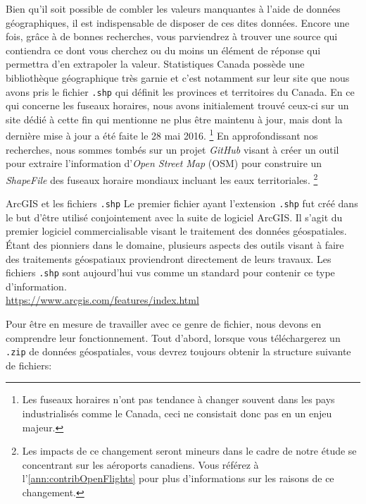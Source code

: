 Bien qu'il soit possible de combler les valeurs manquantes à l'aide de données géographiques, il est indispensable de disposer de ces dites données. Encore une fois, grâce à de bonnes recherches, vous parviendrez à trouver une source qui contiendra ce dont vous cherchez ou du moins un élément de réponse qui permettra d'en extrapoler la valeur. Statistiques Canada possède une bibliothèque géographique très garnie et c'est notamment sur leur site que nous avons pris le fichier \texttt{.shp} qui définit les provinces et territoires du Canada. \cite{Data:BoundaryFiles} En ce qui concerne les fuseaux horaires, nous avons initialement trouvé ceux-ci sur un site \cite{Data:tzWorldwide} dédié à cette fin qui mentionne ne plus être maintenu à jour, mais dont la dernière mise à jour a été faite le 28 mai 2016. \footnote{Les fuseaux horaires n'ont pas tendance à changer souvent dans les pays industrialisés comme le Canada, ceci ne consistait donc pas en un enjeu majeur.} En approfondissant nos recherches, nous sommes tombés sur un projet \emph{GitHub} visant à 
créer un outil pour extraire l'information d'\emph{Open Street Map} (OSM) pour construire un \emph{ShapeFile} des fuseaux horaire mondiaux incluant les eaux territoriales. \cite{timezone-boundary-builder} \footnote{Les impacts de ce changement seront mineurs dans le cadre de notre étude se concentrant sur les aéroports canadiens. Vous référez à l'\autoref{ann:contribOpenFlights} pour plus d'informations sur les raisons de ce changement.} \\

\begin{moreInfo}{ArcGIS et les fichiers \texttt{.shp}}
	Le premier fichier ayant l'extension \texttt{.shp} fut créé dans le but d'être utilisé conjointement avec la suite de logiciel ArcGIS. Il s'agit du premier logiciel commercialisable visant le traitement des données géospatiales. Étant des pionniers dans le domaine, plusieurs aspects des outils visant à faire des traitements géospatiaux proviendront directement de leurs travaux. Les fichiers \texttt{.shp} sont aujourd'hui vus comme un standard pour contenir ce type d'information. \\
\url{https://www.arcgis.com/features/index.html}
\end{moreInfo}

Pour être en mesure de travailler avec ce genre de fichier, nous devons en comprendre leur fonctionnement. Tout d'abord, lorsque vous téléchargerez un \texttt{.zip} de données géospatiales, vous devrez toujours obtenir la structure suivante de fichiers: \\

